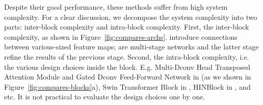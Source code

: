 \documentclass[runningheads]{llncs}
\begin{document}
Despite their good performance, these methods suffer from high system complexity. For a clear discussion, we decompose the system complexity into two parts: 
inter-block complexity and intra-block complexity.
First, the inter-block complexity, as shown in Figure~\ref{fig:compares-archs}. \cite{cho2021rethinking,mao2021deep} introduce connections between various-sized feature maps; \cite{chen2021hinet,waqas2021multi} are multi-stage networks and the latter stage refine the results of the previous stage. 
Second, the intra-block complexity, i.e. the various design choices inside the block. E.g. Multi-Dconv Head Transposed Attention Module and Gated Dconv Feed-Forward Network in \cite{zamir2021restormer} (as we shown in Figure~\ref{fig:compares-blocks}a), Swin Transformer Block in \cite{liu2021swin}, HINBlock in \cite{chen2021hinet}, and etc. It is not practical to evaluate the design choices one by one. 
\end{document}
